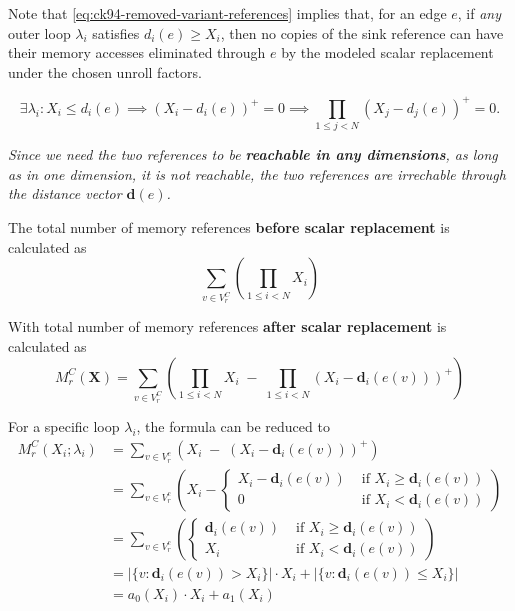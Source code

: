 Note that \cref{eq:ck94-removed-variant-references} implies that,
for an edge \(e\), if \textit{any} outer loop $\lambda_{i}$ satisfies \(d_i(e)\ge X_i\),
then no copies of the sink reference can have their memory accesses eliminated
through \(e\) by the modeled scalar replacement under the chosen unroll factors.

\[
  \exists \lambda_{i}: X_i\le d_i(e)
\implies (X_i-d_i(e))^+=0
\implies \prod_{1 \le j < N}(X_j-d_j(e))^+=0.
\]

\textit{Since we need the two references to be \textbf{reachable in any dimensions}, as
long as in one dimension, it is not reachable, the two references are irrechable
through the distance vector $\mathbf{d}(e)$.}

The total number of memory references \textbf{before scalar replacement} is
calculated as
\begin{equation}
  \sum_{v \in V^{C}_{r}} \left(\prod_{1 \le i < N} X_{i}\right)
  \label{eq:ck94-variant-references-before-replacement}
\end{equation}

With  total number of memory references \textbf{after scalar replacement} is
calculated as
\begin{equation}
  M^{C}_{r}(\mathbf{X}) =
  \sum_{v \in V^{C}_{r}} \left(
  \prod_{1 \le i < N} X_{i} \; - \;
  \prod_{1 \le i < N} \left( X_{i} - \mathbf{d}_{i}(e(v))\right)^{+}
  \right)
\end{equation}

For a specific loop $\lambda_{i}$, the formula can be reduced to
\begin{equation}
  \begin{aligned}
    M^{C}_{r}(X_{i}; \lambda_{i}) &=
    \sum_{v \in V^{c}_{r}} \left(
    X_{i} \; - \; \left( X_{i} - \mathbf{d}_{i}(e(v))\right)^{+}
    \right) \\
    &= \sum_{v \in V^{c}_{r}} \left(
    X_{i} -
    \begin{cases}
      X_{i} - \mathbf{d}_{i}(e(v)) &\text{ if } X_{i} \ge \mathbf{d}_{i}(e(v)) \\
      0 &\text{ if } X_{i} < \mathbf{d}_{i}(e(v))
    \end{cases}
    \right) \\
    &= \sum_{v \in V^{c}_{r}} \left(
    \begin{cases}
      \mathbf{d}_{i}(e(v)) &\text{ if } X_{i} \ge \mathbf{d}_{i}(e(v)) \\
      X_{i} &\text{ if } X_{i} < \mathbf{d}_{i}(e(v))
    \end{cases}
    \right) \\
    &= \left|\{v: \mathbf{d}_{i}(e(v)) > X_{i}\}\right| \cdot X_{i} +
    \left|\{v: \mathbf{d}_{i}(e(v)) \le X_{i}\}\right| \\
    &= a_{0}(X_{i}) \cdot X_{i} + a_{1}(X_{i})
  \end{aligned}
  \label{eq:ck94-single-edge-memory-cost}
\end{equation}

